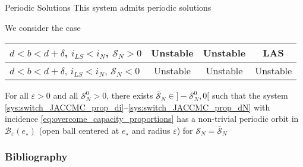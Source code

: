 \documentclass[aspectratio=169]{beamer}\usepackage[]{graphicx}\usepackage[]{xcolor}
\begin{document}
\begin{frame}{Periodic Solutions}
\bbullet This system admits periodic solutions

\bbullet We consider the case
\begin{center}
\begin{tabular}{|l|c|c|c|}
\hline
$d<b<d+\delta$, $i_{LS}<i_N$, $\mathcal{S}_N>0$ & Unstable & Unstable & LAS \\
\hline
$d<b<d+\delta$, $i_{LS}<i_N$, $\mathcal{S}_N<0$ & Unstable & Unstable & Unstable \\
\hline
\end{tabular}
\end{center}

\begin{theorem}
For all $\varepsilon>0$ and all $\mathcal{S}_N^0>0$, there exists $\bar{\mathcal{S}}_N\in ]-\mathcal{S}_N^0,0[$ such that the system \eqref{sys:switch_JACCMC_prop_di}--\eqref{sys:switch_JACCMC_prop_dN} with incidence \eqref{eq:overcome_capacity_proportions} has a non-trivial periodic orbit in $\mathcal{B}_\varepsilon(e_{\star})$ (open ball centered at $e_{\star}$ and radius $\varepsilon$) for $\mathcal{S}_N=\bar{\mathcal{S}}_N$
\end{theorem}
\end{frame}



\begin{frame}[allowframebreaks]
\frametitle{Bibliography}


\end{frame}
\end{document}
